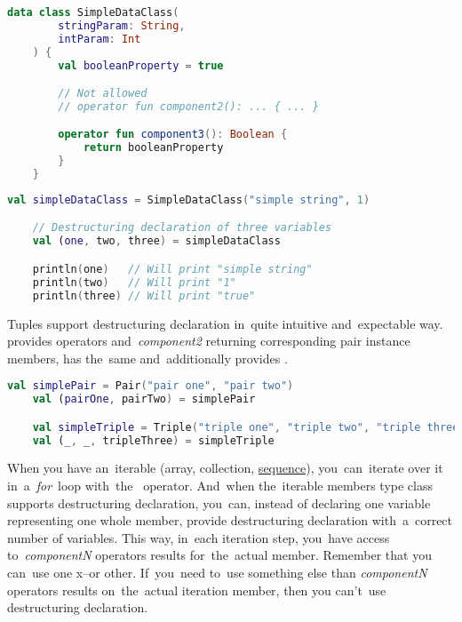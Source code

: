 \begin{lstlisting}[language=Kotlin, title={Data class with two parameters in the primary constructor and additional \mbit{component3}}]
    data class SimpleDataClass(
        stringParam: String,
        intParam: Int
    ) {
        val booleanProperty = true

        // Not allowed
        // operator fun component2(): ... { ... }

        operator fun component3(): Boolean {
            return booleanProperty
        }
    }
\end{lstlisting}
\newline

\begin{lstlisting}[language=Kotlin, title={Destructuring declaration behavior}]
    val simpleDataClass = SimpleDataClass("simple string", 1)

    // Destructuring declaration of three variables
    val (one, two, three) = simpleDataClass

    println(one)   // Will print "simple string"
    println(two)   // Will print "1"
    println(three) // Will print "true"
\end{lstlisting}
\newpage

Tuples support destructuring declaration in~quite intuitive and~expectable way.
 provides operators  \mbox{and \textit{component2}} returning corresponding pair instance members,  has the~same and~additionally provides .
\newline

\begin{lstlisting}[language=Kotlin]
    val simplePair = Pair("pair one", "pair two")
    val (pairOne, pairTwo) = simplePair

    val simpleTriple = Triple("triple one", "triple two", "triple three")
    val (_, _, tripleThree) = simpleTriple
\end{lstlisting}
\newline

\label{kotlindestdeclforloop}
When you have an~iterable (array, collection, \hyperref[kotlinsequence]{sequence}), you~can~iterate over it \mbox{in a \textit{for} loop} \mbox{with the } operator.
And~when the~iterable members type class supports destructuring declaration, you~can, instead of declaring one variable representing one whole member, provide destructuring declaration with~a~correct number of variables.
This way, in~each iteration step, you~have access \mbox{to \textit{componentN}} operators results for~the~actual member.
Remember that you can~use one x--or other.
If~you~need to~use something else than \textit{componentN} operators results on~the~actual iteration member, then you can't~use destructuring declaration.
\newline

